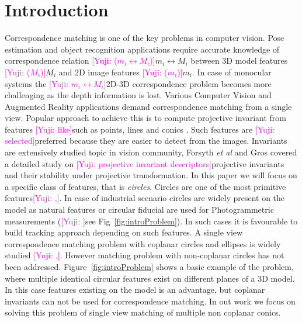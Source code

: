 \documentclass{bmvc2k}
\newcommand{\yuji}[1]{\textcolor{magenta}{[Yuji: #1]}}
\newcommand{\fref}[1]{Fig\bmvaOneDot~\ref{#1}}
\newcommand{\Fref}[1]{Figure~\ref{#1}}
\def\etal{\emph{et al}\bmvaOneDot}
\begin{document}
\section{Introduction}
\label{sec:intro}

Correspondence matching is one of the key problems in computer vision.
Pose estimation and object recognition applications require accurate knowledge of correspondence relation \yuji{($ m_i \leftrightarrow M_i $)}{$ m_i \leftrightarrow M_i $} between 3D model features \yuji{($ M_i $)}{$ M_i $} and 2D image features \yuji{($ m_i $)}{$ m_i $}. 
In case of monocular systems the \yuji{$ m_i \leftrightarrow M_i $}{2D-3D correspondence} problem becomes more challenging as the depth information is lost.
Various Computer Vision and Augmented Reality applications demand correspondence matching from a single view.
Popular approach to achieve this is to compute projective invariant from features \yuji{like}{such as} points, lines and conics \cite{hartley_multiple_2003}.
Such features are \yuji{selected}{preferred} because they are easier to detect from the images. 
Invariants are extensively studied topic in vision community, Forsyth \etal \cite{forsyth_91} and Gros \cite{gros_projective_1992} covered a detailed study on \yuji{projective invariant descriptors}{projective invariants} and their stability under projective transformation. 
In this paper we will focus on a specific class of features, that is \textit{circles}. 
Circles are one of the most primitive features\yuji{,}{.}
In case of industrial scenario circles are widely present on the model as natural features or circular fiducial are used for Photogrammetric measurements \cite{luhmann_close_2006} (\yuji{}{see} \fref{fig:introProblem}).
In such cases it is favourable to build tracking approach depending on such features. 
A single view correspondence matching problem with coplanar circles and ellipses is widely studied \cite{lepetit_monocular_2005}\yuji{,}{.}
However matching problem with non-coplanar circles has not been addressed. 
\Fref{fig:introProblem} shows a basic example of the problem, where multiple identical circular features exist on different planes of a 3D model.
In this case features existing on the model is an advantage, but coplanar invariants can not be used for correspondence matching.
In out work we focus on solving this problem of single view matching of multiple non coplanar conics. 

\end{document}
